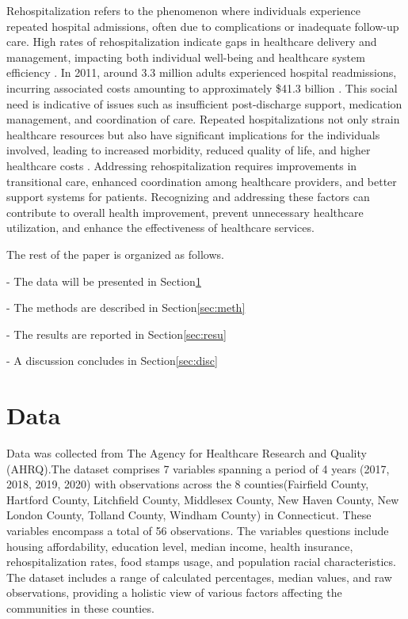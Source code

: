 \documentclass[12pt]{article}
\begin{document}
Rehospitalization refers to the phenomenon
where individuals experience repeated
hospital admissions, often due to
complications or inadequate follow-up care.
High rates of rehospitalization indicate
gaps in healthcare delivery and management,
impacting both individual well-being and
healthcare system efficiency 
\citep{Hudali2017}. 
In 2011, around 3.3 million adults experienced hospital readmissions, 
incurring associated costs amounting to approximately \$41.3 billion 
\citep{Hudali2017}.
This social
need is indicative of issues such as
insufficient post-discharge support,
medication management, and coordination
of care. Repeated hospitalizations not
only strain healthcare resources but also
have significant implications for the
individuals involved, leading to increased
morbidity, reduced quality of life, and
higher healthcare costs 
\citep{Hudali2017}
. Addressing
rehospitalization requires improvements
in transitional care, enhanced coordination
among healthcare providers, and better
support systems for patients. Recognizing and
addressing these factors can contribute
to overall health improvement, prevent
unnecessary healthcare utilization, and
enhance the effectiveness of healthcare
services.

The rest of the paper is organized as follows.

- The data will be presented in Section\ref{sec:data}

- The methods are described in Section\ref{sec:meth}

- The results are reported in Section\ref{sec:resu}

- A discussion concludes in Section\ref{sec:disc}

\section{Data}\label{sec:data}

Data was collected from The Agency for Healthcare Research and Quality (AHRQ).The dataset comprises 7 variables 
spanning a period of 4 years (2017, 2018, 2019, 2020) with observations across the 8 counties(Fairfield County, Hartford County, 
Litchfield County, Middlesex County, New Haven County, New London County, Tolland County, Windham County) in Connecticut. These variables 
encompass a total of 56 observations. The variables questions include housing affordability, education level, median income, health insurance,
rehospitalization rates, food stamps usage, and population racial characteristics. The dataset includes a range of 
calculated percentages, median values, and raw observations, providing a holistic view of various factors affecting 
the communities in these counties. 
\end{document}
